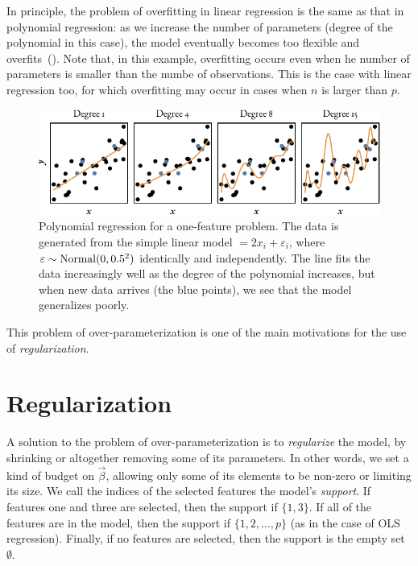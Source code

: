 
In principle, the problem of overfitting in linear regression is the same as that in polynomial regression: as we increase the number of parameters (degree of the polynomial in this case), the model eventually becomes too flexible and overfits~().
Note that, in this example, overfitting occurs even when he number of parameters is smaller than the numbe of observations. This is the case with linear regression too, for which overfitting may occur in cases when \(n\) is larger than \(p\).

\begin{figure}
  \centering
  \includegraphics[]{figures/polyfit.pdf}
  \caption{%
    Polynomial regression for a one-feature problem.
    The data is generated from the simple linear model \( = 2x_i + \varepsilon_i\),
    where \(\varepsilon \sim \operatorname{Normal}(0, 0.5^2)\) identically and independently.
    The line fits the data increasingly well as the degree of the polynomial increases, but when new data arrives (the blue points), we see that the model generalizes poorly.
  }
  \label{fig:polyfit}
\end{figure}

This problem of over-parameterization is one of the main motivations for the use of \emph{regularization}.

\section{Regularization}

A solution to the problem of over-parameterization is to \emph{regularize} the model, by shrinking or altogether removing some of its parameters. In other words, we set a kind of budget on \(\vec{\beta}\), allowing only some of its elements to be non-zero or limiting its size.
We call the indices of the selected features the model's \emph{support}. If features one and three are selected, then the support if \(\{1,3\}\). If all of the features are in the model, then the support if \(\{1,2,\dots,p\}\) (as in the case of OLS regression). Finally, if no features are selected, then the support is the empty set \(\emptyset\).


